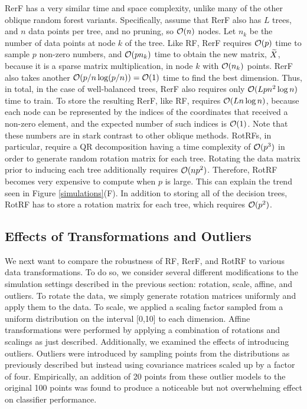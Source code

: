 \documentclass[10pt]{article}
\begin{document}
RerF has a very similar time and space complexity, unlike many of the other oblique random forest variants.  Specifically, assume that RerF also has $L$ trees, and $n$ data points per tree, and no pruning, so $\mathcal{O}(n)$ nodes. Let $n_k$ be the number of data points at node $k$ of the tree. Like RF, RerF requires $\mathcal{O}(p)$ time to sample $p$ non-zero numbers, and $\mathcal{O}(pn_k)$ time to obtain the new matrix, $\widetilde{X}$, because it is a sparse matrix multiplication, in node $k$ with $\mathcal{O}(n_k)$ points. RerF also takes another $\mathcal{O}(p/n\log(p/n))=\mathcal{O}(1)$ time to find the best dimension. Thus, in total, in the case of well-balanced trees, RerF also requires only $\mathcal{O}(Lpn^2\log n)$ time to train.  To store the resulting RerF, like RF, requires $\mathcal{O}(L n\log n )$, because each node can be represented by the indices of the coordinates that received a non-zero element, and the expected number of such indices is $\mathcal{O}(1)$. Note that these numbers are in stark contrast to other oblique methods. RotRFs, in particular, require a QR decomposition having a time complexity of $\mathcal{O}(p^3)$ in order to generate random rotation matrix for each tree. Rotating the data matrix prior to inducing each tree additionally requires $\mathcal{O}(np^2)$. Therefore, RotRF becomes very expensive to compute when $p$ is large. This can explain the trend seen in Figure \ref{simulations}(F). In addition to storing all of the decision trees, RotRF has to store a rotation matrix for each tree, which requires $\mathcal{O}(p^2)$.

\subsection{Effects of Transformations and Outliers}
\label{section: trans}

We next want to compare the robustness of RF, RerF, and RotRF to various data transformations. To do so, we consider several different modifications to the simulation settings described in the previous section: rotation, scale, affine, and outliers.  To rotate the data, we simply generate rotation matrices uniformly and apply them to the data. To scale, we applied a scaling factor sampled from a uniform distribution on the interval [0,10] to each dimension. Affine transformations were performed by applying a combination of rotations and scalings as just described. Additionally, we examined the effects of introducing outliers. Outliers were introduced by sampling points from the distributions as previously described but instead using covariance matrices scaled up by a factor of four. Empirically, an addition of 20 points from these outlier models to the original 100 points was found to produce a noticeable but not overwhelming effect on classifier performance.
\end{document}
